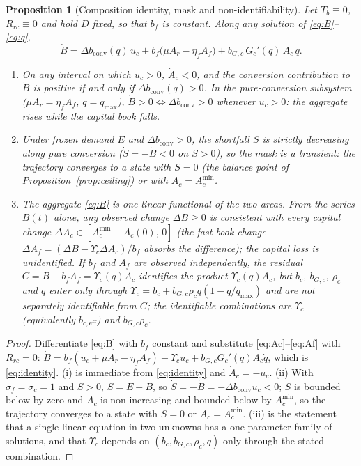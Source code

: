 \documentclass[preprint,12pt,authoryear]{elsarticle}
\newtheorem{proposition}{Proposition}
\newcommand{\dconv}{\Delta b_{\mathrm{conv}}}
\newcommand{\Ups}{\Upsilon_c}
\newcommand{\Acmin}{A_c^{\min}}
\begin{document}
\begin{proposition}[Composition identity, mask and non-identifiability]\label{prop:mask}
Let $T_b\equiv0$, $R_{rc}\equiv0$ and hold $D$ fixed, so that $b_f$ is constant. Along any solution of \eqref{eq:B}--\eqref{eq:q},
\begin{equation}\label{eq:identity}
\dot B=\dconv(q)\,u_c+b_f\big(\mu A_r-\eta_f A_f\big)+b_{G,c}\,G_c'(q)\,A_c\,\dot q .
\end{equation}
\begin{enumerate}[label=(\roman*)]
\item On any interval on which $u_c>0$, $\dot A_c<0$, and the conversion contribution to $\dot B$ is positive if and only if $\dconv(q)>0$. In the pure-conversion subsystem ($\mu A_r=\eta_f A_f$, $q=q_{\max}$), $\dot B>0\iff\dconv>0$ whenever $u_c>0$: the aggregate rises while the capital book falls.
\item Under frozen demand $E$ and $\dconv>0$, the shortfall $S$ is strictly decreasing along pure conversion ($\dot S=-\dot B<0$ on $S>0$), so the mask is a transient: the trajectory converges to a state with $S=0$ (the balance point of Proposition~\ref{prop:ceiling}) or with $A_c=\Acmin$.
\item The aggregate \eqref{eq:B} is one linear functional of the two areas. From the series $B(t)$ alone, any observed change $\Delta B\ge0$ is consistent with every capital change $\Delta A_c\in[\Acmin-A_c(0),\,0]$ (the fast-book change $\Delta A_f=(\Delta B-\Ups\Delta A_c)/b_f$ absorbs the difference); the capital loss is unidentified. If $b_f$ and $A_f$ are observed independently, the residual $C=B-b_fA_f=\Ups(q)A_c$ identifies the product $\Ups(q)A_c$, but $b_c$, $b_{G,c}$, $\rho_c$ and $q$ enter only through $\Ups=b_c+b_{G,c}\rho_c q(1-q/q_{\max})$ and are not separately identifiable from $C$; the identifiable combinations are $\Ups$ (equivalently $b_{c,\mathrm{eff}}$) and $b_{G,c}\rho_c$.
\end{enumerate}
\end{proposition}

\begin{proof}
Differentiate \eqref{eq:B} with $b_f$ constant and substitute \eqref{eq:Ac}--\eqref{eq:Af} with $R_{rc}=0$: $\dot B=b_f(u_c+\mu A_r-\eta_fA_f)-\Ups u_c+b_{G,c}G_c'(q)A_c\dot q$, which is \eqref{eq:identity}. (i) is immediate from \eqref{eq:identity} and $\dot A_c=-u_c$. (ii) With $\sigma_f=\sigma_c=1$ and $S>0$, $S=E-B$, so $\dot S=-\dot B=-\dconv u_c<0$; $S$ is bounded below by zero and $A_c$ is non-increasing and bounded below by $\Acmin$, so the trajectory converges to a state with $S=0$ or $A_c=\Acmin$. (iii) is the statement that a single linear equation in two unknowns has a one-parameter family of solutions, and that $\Ups$ depends on $(b_c,b_{G,c},\rho_c,q)$ only through the stated combination.
\end{proof}
\end{document}

